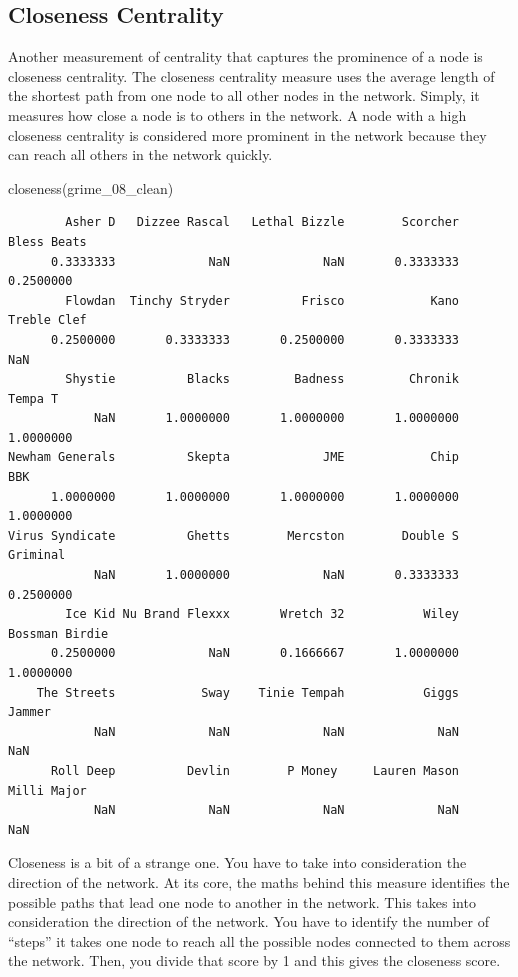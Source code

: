 \documentclass[
  letterpaper,
  DIV=11,
  numbers=noendperiod]{scrreprt}
\newenvironment{Shaded}{\begin{snugshade}}{\end{snugshade}}
\newcommand{\FunctionTok}[1]{\textcolor[rgb]{0.28,0.35,0.67}{#1}}
\newcommand{\NormalTok}[1]{\textcolor[rgb]{0.00,0.23,0.31}{#1}}
\begin{document}
\subsection{Closeness Centrality}\label{closeness-centrality}

Another measurement of centrality that captures the prominence of a node
is closeness centrality. The closeness centrality measure uses the
average length of the shortest path from one node to all other nodes in
the network. Simply, it measures how close a node is to others in the
network. A node with a high closeness centrality is considered more
prominent in the network because they can reach all others in the
network quickly.

\begin{Shaded}
\begin{Highlighting}[]
\FunctionTok{closeness}\NormalTok{(grime\_08\_clean)}
\end{Highlighting}
\end{Shaded}

\begin{verbatim}
        Asher D   Dizzee Rascal   Lethal Bizzle        Scorcher     Bless Beats 
      0.3333333             NaN             NaN       0.3333333       0.2500000 
        Flowdan  Tinchy Stryder          Frisco            Kano     Treble Clef 
      0.2500000       0.3333333       0.2500000       0.3333333             NaN 
        Shystie          Blacks         Badness         Chronik         Tempa T 
            NaN       1.0000000       1.0000000       1.0000000       1.0000000 
Newham Generals          Skepta             JME            Chip             BBK 
      1.0000000       1.0000000       1.0000000       1.0000000       1.0000000 
Virus Syndicate          Ghetts        Mercston        Double S        Griminal 
            NaN       1.0000000             NaN       0.3333333       0.2500000 
        Ice Kid Nu Brand Flexxx       Wretch 32           Wiley  Bossman Birdie 
      0.2500000             NaN       0.1666667       1.0000000       1.0000000 
    The Streets            Sway    Tinie Tempah           Giggs          Jammer 
            NaN             NaN             NaN             NaN             NaN 
      Roll Deep          Devlin        P Money     Lauren Mason     Milli Major 
            NaN             NaN             NaN             NaN             NaN 
\end{verbatim}

Closeness is a bit of a strange one. You have to take into consideration
the direction of the network. At its core, the maths behind this measure
identifies the possible paths that lead one node to another in the
network. This takes into consideration the direction of the network. You
have to identify the number of ``steps'' it takes one node to reach all
the possible nodes connected to them across the network. Then, you
divide that score by 1 and this gives the closeness score.
\end{document}
